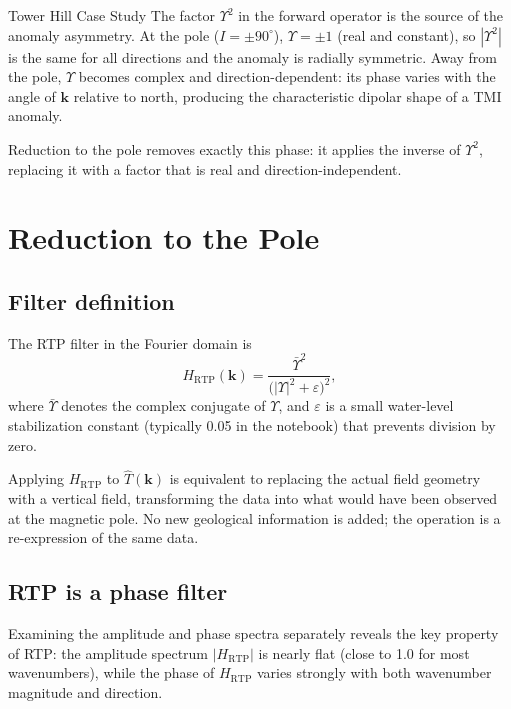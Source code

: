 \begin{activity}{Tower Hill Case Study}
The factor $\Upsilon^2$ in the forward operator is the source of the anomaly
asymmetry.
At the pole ($I = \pm 90^\circ$), $\Upsilon = \pm 1$ (real and constant),
so $|\Upsilon^2|$ is the same for all directions and the anomaly is radially
symmetric.
Away from the pole, $\Upsilon$ becomes complex and direction-dependent:
its phase varies with the angle of $\mathbf{k}$ relative to north, producing
the characteristic dipolar shape of a TMI anomaly.

Reduction to the pole removes exactly this phase: it applies the inverse of
$\Upsilon^2$, replacing it with a factor that is real and direction-independent.

\section{Reduction to the Pole}

\subsection{Filter definition}

The RTP filter in the Fourier domain is
\begin{equation}
H_\text{RTP}(\mathbf{k})
  = \frac{\bar{\Upsilon}^2}
         {\bigl(|\Upsilon|^2 + \varepsilon\bigr)^2},
\end{equation}
where $\bar{\Upsilon}$ denotes the complex conjugate of $\Upsilon$,
and $\varepsilon$ is a small water-level stabilization constant
(typically 0.05 in the notebook) that prevents division by zero.

Applying $H_\text{RTP}$ to $\hat{T}(\mathbf{k})$ is equivalent to replacing
the actual field geometry with a vertical field, transforming the data into
what would have been observed at the magnetic pole.
No new geological information is added; the operation is a re-expression of
the same data.

\subsection{RTP is a phase filter}

Examining the amplitude and phase spectra separately reveals the key property
of RTP: the amplitude spectrum $|H_\text{RTP}|$ is nearly flat (close to 1.0
for most wavenumbers), while the phase of $H_\text{RTP}$ varies strongly with
both wavenumber magnitude and direction.


\end{activity}
